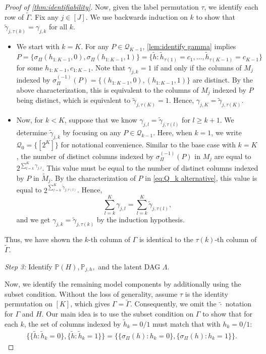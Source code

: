 \documentclass[10pt]{article} %
\newcommand{\PP}{\mathbb P}
\def\tilde{\widetilde}
\begin{document}
\begin{proof}[Proof of \cref{thm:identifiability}]
%
%

%
%
%
%
%
%
%
%
%

Now, given the label permutation $\tau$, we identify each row of $\tilde{\Gamma}$.
%
Fix any $j \in [J]$.
We use backwards induction on $k$ to show that $\tilde{\gamma}_{j,\tau(k)} = \gamma_{j,k}$ for all $k$. 
\begin{itemize}
\item We start with $k = K$. For any $P \in \mathcal{Q}_{K-1}$, \cref{lem:identify gamma} implies 
$$P = \{\sigma_\Pi(h_{1:K-1},0), \sigma_\Pi(h_{1:K-1},1)\} =  \{\tilde{h}: \tilde{h}_{\tau(1)} = c_1, \ldots, \tilde{h}_{\tau(K-1)} = c_{K-1} \}$$ 
for some $h_{1:K-1}, c_{1:K-1}.$
Note that $\gamma_{j,k} = 1$ if and only if the columns of $M_j$ indexed by $\sigma_\Pi^{(-1)}(P) = \{(h_{1:K-1},0), (h_{1:K-1},1)\}$ are distinct. By the above characterization, this is equivalent to the columns of $M_j$ indexed by $P$ being distinct, which is equivalent to $\tilde{\gamma}_{j,\tau(K)} = 1$. Hence, $\gamma_{j,K} = \tilde{\gamma}_{j,\tau(K)}$.

\item Now, for $k < K$, suppose that we know $\gamma_{j,l} = \tilde{\gamma}_{j,\tau(l)}$ for $l \ge k+1$. We determine $\tilde{\gamma}_{j,k}$ by focusing on any $P \in \mathcal{Q}_{k-1}$. 
%
Here, when $k = 1$, we write $\mathcal{Q}_{0} = \{[2^K]\}$ for notational convenience. Similar to the base case with $k = K$, the number of distinct columns indexed by $\sigma_\Pi^{(-1)}(P)$ in $M_j$ are equal to $2^{\sum_{l=k}^K {\gamma}_{j,l}}$. This value must be equal to the number of distinct columns indexed by $P$ in $\tilde{M}_j$. By the characterization of $P$ in \eqref{eq:Q_k alternative}, this value is equal to $2^{\sum_{l=k}^K \tilde{\gamma}_{j,\tau(l)}}$. Hence, 
$$\sum_{l=k}^K {\gamma}_{j,l} = \sum_{l=k}^K \tilde{\gamma}_{j,\tau(l)},$$
and we get $\gamma_{j,k} = \tilde{\gamma}_{j,\tau(k)}$ by the induction hypothesis.
\end{itemize}
Thus, we have shown the $k$-th column of $\Gamma$ is identical to the $\tau(k)$-th column of $\tilde{\Gamma}$.




%

%

\emph{Step 3:} Identify $\PP(H), \PP_{j,h},$ and the latent DAG $\Lambda$.

Now, we identify the remaining model components by additionally using the subset condition. Without the loss of generality, assume $\tau$ is the identity permutation on $[K]$, which gives $\Gamma = \tilde{\Gamma}.$ Consequently, we omit the $\tilde{\cdot}$ notation for $\Gamma$ and $H$.
Our main idea is to use the subset condition on $\Gamma$ to %
show that for each $k$, the set of columns indexed by $\tilde{h}_k = 0/1$ must match that with $h_k = 0/1$:
\begin{align}\label{eq:column index suffices}
    \big\{\{\tilde{h}: \tilde{h}_k = 0\}, \{\tilde{h}: \tilde{h}_k = 1\} \big\} = \big\{\{\sigma_\Pi (h): h_k=0\}, \{\sigma_\Pi (h): h_k=1\}\big\}.
\end{align}


\end{proof}
\end{document}
